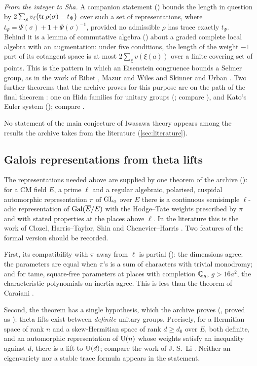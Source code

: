 \emph{From the integer to Sha.} A companion statement \lvS{} () bounds the
length in question by $2\sum_{\rho}v_\ell\bigl(\operatorname{tr}\rho(\sigma)-t_\Psi\bigr)$ over such a set of
representations, where $t_\Psi=\Psi(\sigma)+1+\Psi(\sigma)^{-1}$, provided no admissible $\rho$ has
trace exactly $t_\Psi$. Behind it is a lemma of commutative algebra \lvS{} () about a
graded complete local algebra with an augmentation: under five conditions, the length of the
weight $-1$ part of its cotangent space is at most $2\sum_\xi v(\xi(a))$ over a finite covering
set of points. This is the pattern in which an Eisenstein congruence bounds a Selmer group, as
in the work of Ribet \cite{ribet1976}, Mazur and Wiles \cite{mazurwiles1984} and Skinner and
Urban \cite{skinnerurban2014}. Two further theorems that the archive proves for this purpose
are on the path of the final theorem \lvS: one on Hida families for unitary groups
(; compare \cite{hida1986}), and Kato's Euler system
\cite{kato2004} (); compare \cite{blochkato1990}.

No statement of the main conjecture of Iwasawa theory appears among the results the archive
takes from the literature (\cref{sec:literature}).

\subsection{Galois representations from theta lifts}\label{sec:galois}
The representations needed above are supplied by one theorem of the archive \lvS{}
(): for a CM field $E$, a prime $\ell$ and a
regular algebraic, polarised, cuspidal automorphic representation $\pi$ of $\mathrm{GL}_a$ over $E$
there is a continuous semisimple $\ell$-adic representation of $\operatorname{Gal}(\overline E/E)$ with the
Hodge--Tate weights prescribed by $\pi$ and with stated properties at the places above $\ell$.
In the literature this is the work of Clozel, Harris--Taylor, Shin and Chenevier--Harris
\cite{clozel1991,harristaylor2001,shin2011,chenevierharris2013}. Two features of the formal
version should be recorded.

First, its compatibility with $\pi$ away from $\ell$ is partial \lvS{} (): the
dimensions agree; the parameters are equal when $\pi$'s is a sum of characters with trivial
monodromy; and for tame, square-free parameters at places with completion $\mathbb{Q}_g$, $g>16a^2$,
the characteristic polynomials on inertia agree. This is less than the theorem of Caraiani
\cite{caraiani2012}.

Second, the theorem has a single hypothesis, which the archive proves \lvS{}
(, proved as ): theta lifts exist between \emph{definite} unitary
groups. Precisely, for a Hermitian space of rank $n$ and a skew-Hermitian space of rank
$d\ge d_0$ over $E$, both definite, and an automorphic representation of $\mathrm{U}(n)$ whose weights
satisfy an inequality against $d$, there is a lift to $\mathrm{U}(d)$; compare the work of J.-S.~Li
\cite{li1992}. Neither an eigenvariety nor a stable trace formula appears in the statement.
